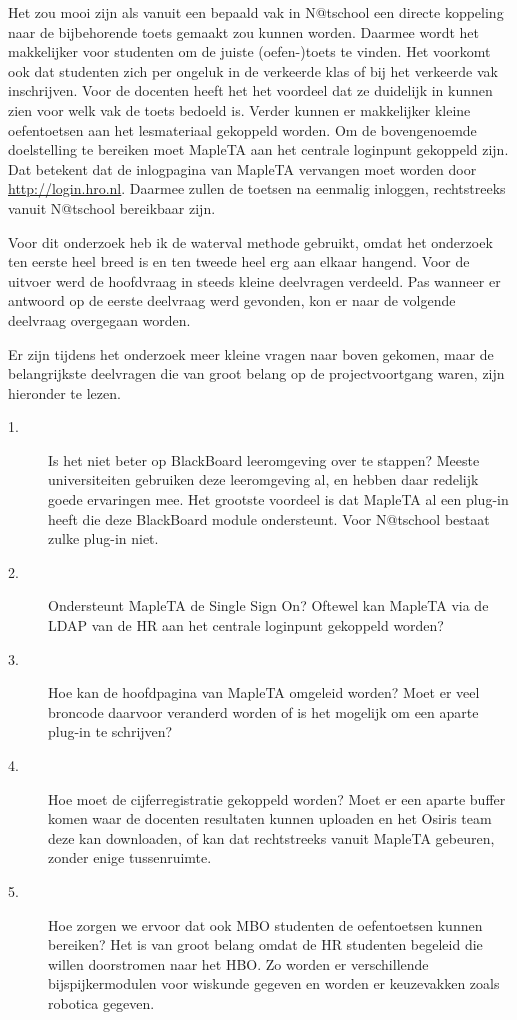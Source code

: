 Het zou mooi zijn als vanuit een bepaald vak in N@tschool een directe
koppeling naar de bijbehorende toets gemaakt zou kunnen
worden. Daarmee wordt het makkelijker voor studenten om de juiste
(oefen-)toets te vinden. Het voorkomt ook dat studenten zich per
ongeluk in de verkeerde klas of bij het verkeerde vak
inschrijven. Voor de docenten heeft het het voordeel dat ze duidelijk
in kunnen zien voor welk vak de toets bedoeld is. Verder kunnen er
makkelijker kleine oefentoetsen aan het lesmateriaal gekoppeld worden.
 Om de bovengenoemde doelstelling te
bereiken moet MapleTA aan het centrale loginpunt gekoppeld zijn. Dat
betekent dat de inlogpagina van MapleTA vervangen moet worden door
\url{http://login.hro.nl}. Daarmee zullen de toetsen na eenmalig
inloggen, rechtstreeks vanuit N@tschool bereikbaar zijn.


Voor dit onderzoek heb ik de waterval methode \cite{waterval}
gebruikt, omdat het onderzoek ten eerste heel breed is en ten tweede
heel erg aan elkaar hangend. Voor de uitvoer werd de hoofdvraag in
steeds kleine deelvragen verdeeld. Pas wanneer er antwoord op de
eerste deelvraag werd gevonden, kon er naar de volgende deelvraag
overgegaan worden.


Er zijn tijdens het onderzoek meer kleine vragen naar boven gekomen,
maar de belangrijkste deelvragen die van groot belang op de
projectvoortgang waren, zijn hieronder te lezen.

\begin{description}
\item[1.] Is het niet beter op BlackBoard leeromgeving over te
  stappen? Meeste universiteiten gebruiken deze leeromgeving al, en
  hebben daar redelijk goede ervaringen mee. Het grootste voordeel is
  dat MapleTA al een plug-in heeft die deze BlackBoard module
  ondersteunt. Voor N@tschool bestaat zulke plug-in niet.
\item[2.] Ondersteunt MapleTA de Single Sign On? Oftewel kan MapleTA
  via de LDAP van de HR aan het centrale loginpunt gekoppeld worden?
\item[3.] Hoe kan de hoofdpagina van MapleTA omgeleid worden?  Moet er
  veel broncode daarvoor veranderd worden of is het mogelijk om een
  aparte plug-in te schrijven?
\item[4.] Hoe moet de cijferregistratie gekoppeld worden? Moet er een
  aparte buffer komen waar de docenten resultaten kunnen uploaden en
  het Osiris team deze kan downloaden, of kan dat rechtstreeks vanuit
  MapleTA gebeuren, zonder enige tussenruimte.
\item[5.] Hoe zorgen we ervoor dat ook MBO studenten de oefentoetsen
  kunnen bereiken? Het is van groot belang omdat de HR studenten
  begeleid die willen doorstromen naar het HBO. Zo worden er
  verschillende bijspijkermodulen voor wiskunde gegeven en worden er
  keuzevakken zoals robotica gegeven.
\end{description}

